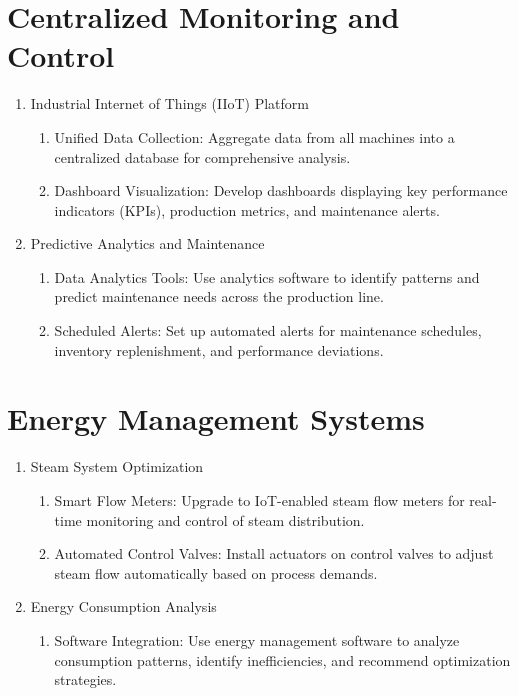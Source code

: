 \section{Centralized Monitoring and Control}
\begin{enumerate}
    \item Industrial Internet of Things (IIoT) Platform
    \begin{enumerate}
        \item Unified Data Collection: Aggregate data from all machines into a centralized database for comprehensive analysis.
        \item Dashboard Visualization: Develop dashboards displaying key performance indicators (KPIs), production metrics, and maintenance alerts.
    \end{enumerate}
    \item Predictive Analytics and Maintenance
    \begin{enumerate}
        \item Data Analytics Tools: Use analytics software to identify patterns and predict maintenance needs across the production line.
        \item Scheduled Alerts: Set up automated alerts for maintenance schedules, inventory replenishment, and performance deviations.
    \end{enumerate}
\end{enumerate}

\section{Energy Management Systems}
\begin{enumerate}
    \item Steam System Optimization
    \begin{enumerate}
        \item Smart Flow Meters: Upgrade to IoT-enabled steam flow meters for real-time monitoring and control of steam distribution.
        \item Automated Control Valves: Install actuators on control valves to adjust steam flow automatically based on process demands.
    \end{enumerate}
    \item Energy Consumption Analysis
    \begin{enumerate}
        \item Software Integration: Use energy management software to analyze consumption patterns, identify inefficiencies, and recommend optimization strategies.
    \end{enumerate}
\end{enumerate}

